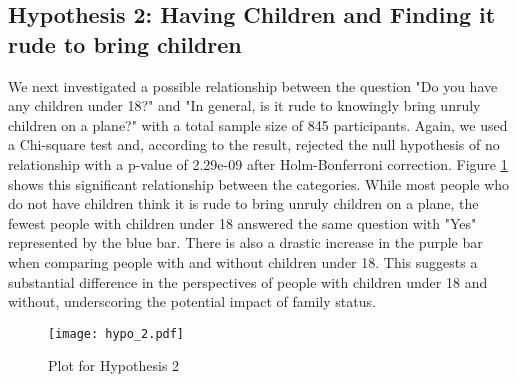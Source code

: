 \documentclass{article}
\theoremstyle{plain}
\theoremstyle{definition}
\theoremstyle{remark}
\begin{document}
\subsection{Hypothesis 2: Having Children and Finding it rude to bring children}
We next investigated a possible relationship between the question "Do you have any children under 18?" and "In general, is it rude to knowingly bring unruly children on a plane?" with a total sample size of 845 participants. Again, we used a Chi-square test and, according to the result, rejected the null hypothesis of no relationship with a p-value of 2.29e-09 after Holm-Bonferroni correction. Figure \ref{hypothesis2} shows this significant relationship between the categories.  While most people who do not have children think it is rude to bring unruly children on a plane, the fewest people with children under 18 answered the same question with "Yes" represented by the blue bar. There is also a drastic increase in the purple bar when comparing people with and without children under 18. This suggests a substantial difference in the perspectives of people with children under 18 and without, underscoring the potential impact of family status.
\begin{figure}[h]
    \texttt{[image: hypo\_2.pdf]}
    \caption{Plot for Hypothesis 2}
    \label{hypothesis2}
\end{figure}
\end{document}
